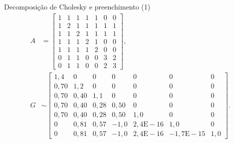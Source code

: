 \documentclass[10pt]{beamer}
\begin{document}
\begin{frame}{Decomposição de Cholesky e preenchimento (1)}
  \begin{align*}
      A &= \begin{bmatrix}
          1 & 1 & 1 & 1 & 1 & 0 & 0 \\
          1 & 2 & 1 & 1 & 1 & 1 & 1 \\
          1 & 1 & 2 & 1 & 1 & 1 & 1 \\
          1 & 1 & 1 & 2 & 1 & 0 & 0 \\
          1 & 1 & 1 & 1 & 2 & 0 & 0 \\
          0 & 1 & 1 & 0 & 0 & 3 & 2 \\
          0 & 1 & 1 & 0 & 0 & 2 & 3
      \end{bmatrix}, \\
      G &\sim \begin{bmatrix}
          1,4 & 0   & 0   &  0    & 0                &  0                &  0   \\
          0,70& 1,2 & 0   &  0    & 0                &  0                &  0   \\
          0,70& 0,40& 1,1 &  0    & 0                &  0                &  0   \\
          0,70& 0,40& 0,28&  0,50 & 0                &  0                &  0   \\
          0,70& 0,40& 0,28&  0,50 & 1,0              &  0                &  0   \\
          0   & 0,81& 0,57& -1,0  & 2,4\mathrm{E}-16 &  1,0              &  0   \\
          0   & 0,81& 0,57& -1,0  & 2,4\mathrm{E}-16 & -1,7\mathrm{E}-15 &  1,0
      \end{bmatrix}.
  \end{align*}
\end{frame}
\end{document}
